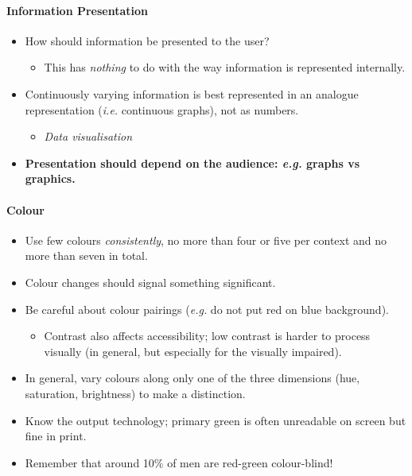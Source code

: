 \documentclass[a4paper]{article}
\providecommand{\tightlist}{%
  \setlength{\itemsep}{0pt}\setlength{\parskip}{0pt}}
\let\oldparagraph\paragraph
\renewcommand{\paragraph}[1]{\oldparagraph{#1}\mbox{}}
\begin{document}
\hypertarget{information-presentation}{%
\paragraph{Information Presentation}\label{information-presentation}}

\begin{itemize}
\item
  How should information be presented to the user?

  \begin{itemize}
  \tightlist
  \item
    This has \emph{nothing} to do with the way information is
    represented internally.
  \end{itemize}
\item
  Continuously varying information is best represented in an analogue
  representation (\emph{i.e.} continuous graphs), not as numbers.

  \begin{itemize}
  \tightlist
  \item
    \emph{Data visualisation}
  \end{itemize}
\item
  \textbf{Presentation should depend on the audience: \emph{e.g.} graphs
  vs graphics.}
\end{itemize}

\hypertarget{colour}{%
\paragraph{Colour}\label{colour}}

\begin{itemize}
\tightlist
\item
  Use few colours \emph{consistently}, no more than four or five per
  context and no more than seven in total.
\item
  Colour changes should signal something significant.
\item
  Be careful about colour pairings (\emph{e.g.} do not put red on blue
  background).

  \begin{itemize}
  \tightlist
  \item
    Contrast also affects accessibility; low contrast is harder to
    process visually (in general, but especially for the visually
    impaired).
  \end{itemize}
\item
  In general, vary colours along only one of the three dimensions (hue,
  saturation, brightness) to make a distinction.
\item
  Know the output technology; primary green is often unreadable on
  screen but fine in print.
\item
  Remember that around 10\% of men are red-green colour-blind!
\end{itemize}
\end{document}
